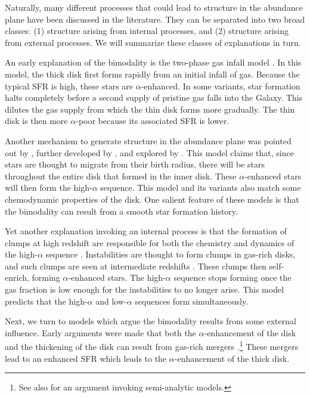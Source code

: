 Naturally, many different processes that could lead to structure in the abundance plane have been discussed in the literature. They can be separated into two broad classes: (1) structure arising from internal processes, and (2) structure arising from external processes. We will summarize these classes of explanations in turn.

An early explanation of the bimodality is the two-phase gas infall model \citep{1997ApJ...477..765C,2009IAUS..254..191C,2017MNRAS.472.3637G,2019A&A...623A..60S}. In this model, the thick disk first forms rapidly from an initial infall of gas. Because the typical SFR is high, these stars are $\alpha$-enhanced. In some variants, star formation halts completely before a second supply of pristine gas falls into the Galaxy. This dilutes the gas supply from which the thin disk forms more gradually. The thin disk is then more $\alpha$-poor because its associated SFR is lower.

Another mechanism to generate structure in the abundance plane was pointed out by \citet{2009MNRAS.396..203S}, further developed by \citet{2021MNRAS.507.5882S,2023MNRAS.523.3791C}, and explored by \citet{2011ApJ...737....8L,2021MNRAS.508.4484J}. This model claims that, since stars are thought to migrate from their birth radius, there will be stars throughout the entire disk that formed in the inner disk. These $\alpha$-enhanced stars will then form the high-$\alpha$ sequence. This model and its variants also match some chemodynamic properties of the disk. One salient feature of these models is that the bimodality can result from a smooth star formation history.

Yet another explanation invoking an internal process is that the formation of clumps at high redshift are responsible for both the chemistry and dynamics of the high-$\alpha$ sequence \citep{2019MNRAS.484.3476C,2020MNRAS.492.4716B,2021MNRAS.502..260B,2023ApJ...953..128G}. Instabilities are thought to form clumps in gas-rich disks, and such clumps are seen at intermediate redshifts \citep[$z\sim2$;][]{2005ApJ...627..632E,2007ApJ...658..763E}. These clumps then self-enrich, forming $\alpha$-enhanced stars. The high-$\alpha$ sequence stops forming once the gas fraction is low enough for the instabilities to no longer arise. This model predicts that the high-$\alpha$ and low-$\alpha$ sequences form simultaneously.

Next, we turn to models which argue the bimodality results from some external influence. Early arguments were made that both the $\alpha$-enhancement of the disk and the thickening of the disk can result from gas-rich mergers \citep{2004ApJ...612..894B,2005ApJ...630..298B,2007ApJ...658...60B,2010MNRAS.402.1489R}.\footnote{See also \citet{2009MNRAS.400.1347C} for an argument invoking semi-analytic models.} These mergers lead to an enhanced SFR which leads to the $\alpha$-enhancement of the thick disk.

